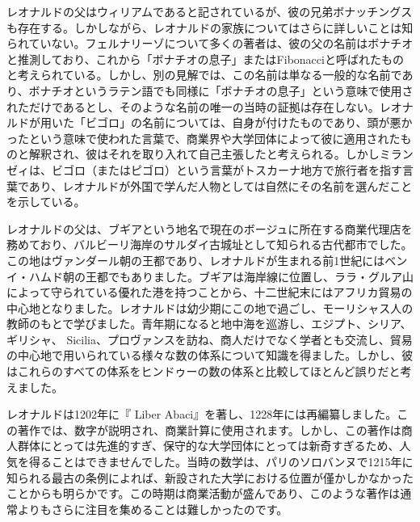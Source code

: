 \documentclass[a4paper,11pt,openany]{ltjsbook}
\begin{document}
レオナルドの父はウィリアムであると記されているが、彼の兄弟ボナッチングスも存在する。しかしながら、レオナルドの家族についてはさらに詳しいことは知られていない。フェルナリーゾについて多くの著者は、彼の父の名前はボナチオと推測しており、これから「ボナチオの息子」またはFibonacciと呼ばれたものと考えられている。しかし、別の見解では、この名前は単なる一般的な名前であり、ボナチオというラテン語でも同様に「ボナチオの息子」という意味で使用されただけであるとし、そのような名前の唯一の当時の証拠は存在しない。レオナルドが用いた「ビゴロ」の名前については、自身が付けたものであり、頭が悪かったという意味で使われた言葉で、商業界や大学団体によって彼に適用されたものと解釈され、彼はそれを取り入れて自己主張したと考えられる。しかしミランゼィは、ビゴロ（またはピゴロ）という言葉がトスカーナ地方で旅行者を指す言葉であり、レオナルドが外国で学んだ人物としては自然にその名前を選んだことを示している。

レオナルドの父は、ブギアという地名で現在のボージュに所在する商業代理店を務めており、バルビーリ海岸のサルダイ古城址として知られる古代都市でした。この地はヴァンダール朝の王都であり、レオナルドが生まれる前1世紀にはベンイ・ハムド朝の王都でもありました。ブギアは海岸線に位置し、ララ・グルア山によって守られている優れた港を持つことから、十二世紀末にはアフリカ貿易の中心地となりました。レオナルドは幼少期にこの地で過ごし、モーリシャス人の教師のもとで学びました。青年期になると地中海を巡游し、エジプト、シリア、ギリシャ、 Sicilia、プロヴァンスを訪ね、商人だけでなく学者とも交流し、貿易の中心地で用いられている様々な数の体系について知識を得ました。しかし、彼はこれらのすべての体系をヒンドゥーの数の体系と比較してほとんど誤りだと考えました。

レオナルドは1202年に『 Liber Abaci』を著し、1228年には再編纂しました。この著作では、数字が説明され、商業計算に使用されます。しかし、この著作は商人群体にとっては先進的すぎ、保守的な大学団体にとっては新奇すぎるため、人気を得ることはできませんでした。当時の数学は、パリのソロバンヌで1215年に知られる最古の条例によれば、新設された大学における位置が僅かしかなかったことからも明らかです。この時期は商業活動が盛んであり、このような著作は通常よりもさらに注目を集めることは難しかったのです。
\end{document}
